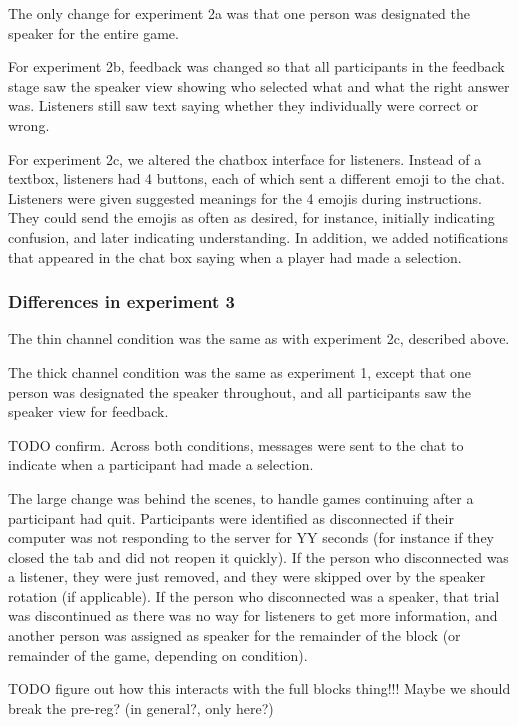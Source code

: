 \documentclass[
  english,
  a4paper,
]{article}
\begin{document}
The only change for experiment 2a was that one person was designated the speaker for the entire game.

For experiment 2b, feedback was changed so that all participants in the feedback stage saw the speaker view showing who selected what and what the right answer was. Listeners still saw text saying whether they individually were correct or wrong.

For experiment 2c, we altered the chatbox interface for listeners. Instead of a textbox, listeners had 4 buttons, each of which sent a different emoji to the chat. Listeners were given suggested meanings for the 4 emojis during instructions. They could send the emojis as often as desired, for instance, initially indicating confusion, and later indicating understanding. In addition, we added notifications that appeared in the chat box saying when a player had made a selection.

\hypertarget{differences-in-experiment-3}{%
\subsubsection{Differences in experiment 3}\label{differences-in-experiment-3}}

The thin channel condition was the same as with experiment 2c, described above.

The thick channel condition was the same as experiment 1, except that one person was designated the speaker throughout, and all participants saw the speaker view for feedback.

TODO confirm. Across both conditions, messages were sent to the chat to indicate when a participant had made a selection.

The large change was behind the scenes, to handle games continuing after a participant had quit. Participants were identified as disconnected if their computer was not responding to the server for YY seconds (for instance if they closed the tab and did not reopen it quickly). If the person who disconnected was a listener, they were just removed, and they were skipped over by the speaker rotation (if applicable). If the person who disconnected was a speaker, that trial was discontinued as there was no way for listeners to get more information, and another person was assigned as speaker for the remainder of the block (or remainder of the game, depending on condition).

TODO figure out how this interacts with the full blocks thing!!! Maybe we should break the pre-reg? (in general?, only here?)
\end{document}
